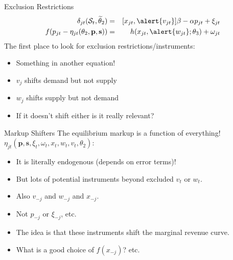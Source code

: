 \documentclass[xcolor=pdftex,dvipsnames,table,mathserif,aspectratio=169]{beamer}
\begin{document}
\begin{frame}{Exclusion Restrictions}
\begin{eqnarray*}
    \delta_{jt}(\mathcal{S}_t,\widetilde{\theta}_2) &=&  [x_{jt}, \alert{v_{jt}}]  \beta  - \alpha p_{jt} + \xi_{jt}\\
    f(p_{jt} - \eta_{jt}(\theta_2,\mathbf{p},\mathbf{s})) &=&   h(x_{jt},\alert{w_{jt}};\theta_3)+\omega_{jt}
\end{eqnarray*}
The first place to look for exclusion restrictions/instruments:
\begin{itemize}
\item Something in another equation!
\item $v_j$ shifts demand but not supply
\item $w_j$ shifts supply but not demand
\item If it doesn't shift either is it really relevant?
\end{itemize}
\end{frame}


\begin{frame}{Markup Shifters}
The equilibrium markup is a function of \alert{everything!} $\eta_{jt}(\mathbf{p},\mathbf{s},\xi_t,\omega_t,x_{t},w_{t},v_t,\theta_2)$:
\begin{itemize}
\item It is literally \alert{endogenous} (depends on error terms)!
\item But lots of potential instruments beyond \alert{excluded} $v_t$ or $w_t$.
\item Also $v_{-j}$ and $w_{-j}$ and $x_{-j}$.
\item Not $p_{-j}$ or $\xi_{-j}$, etc.
\item The idea is that these instruments shift the \alert{marginal revenue curve}.
\item What is a good choice of $f(x_{-j})$? etc.
\end{itemize}
\end{frame}
\end{document}
